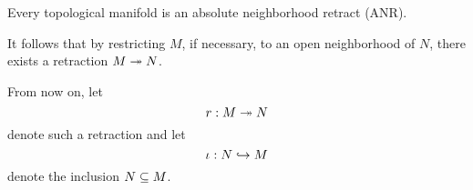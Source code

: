 \begin{myparagraph}
    Every topological manifold is an absolute neighborhood retract (ANR).
    
    It follows that by restricting $M$, if necessary, to an open neighborhood of $N$,
    there exists a retraction $M \twoheadrightarrow{} N$.

    From now on, let
    \[ r: M \twoheadrightarrow{} N \]
    denote such a retraction and let
    \[ \iota: N \hookrightarrow{} M \]
    denote the inclusion $N \subseteq{} M$.
\end{myparagraph}